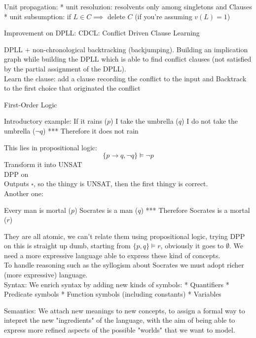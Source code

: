 Unit propagation: 
* unit resoluzion: resolvents only among singletons and Clauses %
* unit subsumption: if $L \in C \implies$ delete $C$ (if you're assuming $v(L) = 1$)


Improvement on DPLL: CDCL: Conflict Driven Clause Learning

DPLL $+$ non-chronological backtracking (backjumping). Building an implication graph while building the DPLL which is able to find conflict clauses (not satisfied by the partial assignment of the DPLL).\\

Learn the clause: add a clause recording the conflict to the input and 
Backtrack to the first choice that originated the conflict



First-Order Logic

Introductory example: 
If it rains ($p$) I take the umbrella ($q$) 
I do not take the umbrella  ($\neg q$)
***
Therefore it does not rain

This lies in propositional logic:
$$ \{p \rightarrow q, \neg q\} \models \neg p $$
Transform it into UNSAT
$$ 
$$
DPP on
$$
$$
Outputs $\square$, so the thingy is UNSAT, then the first thingy is correct.\\

Another one:

Every man is mortal ($p$)
Socrates is a man ($q$)
***
Therefore Socrates is a mortal ($r$)

They are all atomic, we can't relate them using propositional logic, trying DPP on this is straight up dumb, starting from $\{p,q\} \models r$, obviously it goes to $\emptyset$. We need a more expressive language able to express these kind of concepts.\\

To handle reasoning such as the syllogism about Socrates we must adopt richer (more expressive) language.\\

Syntax: We enrich syntax by adding new kinds of symbols: 
* Quantifiers
* Predicate symbols
* Function symbols (including constants)
* Variables

Semantics: We attach new meanings to new concepts, to assign a formal way to intepret the new "ingredients" of the language, with the aim of being able to express more refined aspects of the possible "worlds" that we want to model.\\

